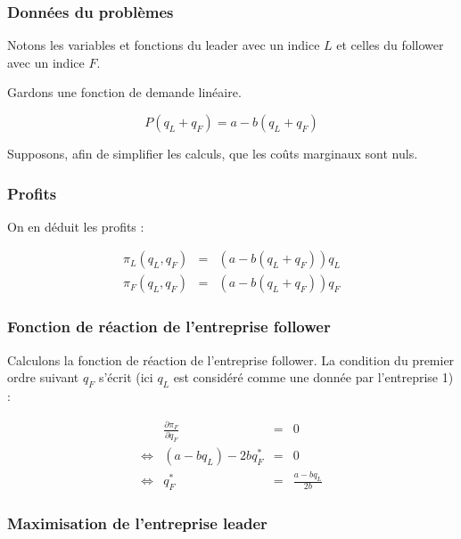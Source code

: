 \documentclass[
]{book}
\theoremstyle{definition}
\theoremstyle{definition}
\theoremstyle{definition}
\theoremstyle{definition}
\theoremstyle{remark}
\begin{document}
\hypertarget{donnuxe9es-du-probluxe8mes}{%
\subsubsection{Données du problèmes}\label{donnuxe9es-du-probluxe8mes}}

Notons les variables et fonctions du leader avec un indice \(L\) et celles du follower avec un indice \(F\).

Gardons une fonction de demande linéaire.

\[
P(q_L+q_F) = a - b(q_L+q_F)
\]

Supposons, afin de simplifier les calculs, que les coûts marginaux sont nuls.

\hypertarget{profits-1}{%
\subsubsection{Profits}\label{profits-1}}

On en déduit les profits :

\[
\begin{array}{rcl}
\pi_L(q_L, q_F) &=& \left(a-b(q_L+q_F)\right)q_L\\
\pi_F(q_L, q_F) &=& \left(a-b(q_L+q_F)\right)q_F
\end{array}
\]

\hypertarget{fonction-de-ruxe9action-de-lentreprise-follower}{%
\subsubsection{Fonction de réaction de l'entreprise follower}\label{fonction-de-ruxe9action-de-lentreprise-follower}}

Calculons la fonction de réaction de l'entreprise follower.
La condition du premier ordre suivant \(q_F\) s'écrit (ici \(q_L\) est considéré comme une donnée par l'entreprise 1) :

\[
\begin{array}{crcl}
&\frac{\partial \pi_F}{\partial q_F}&=&0\\
\Leftrightarrow & (a-bq_L)-2bq_F^* &=& 0\\
\Leftrightarrow & q_F^* &=& \frac{a-bq_L}{2b}
\label{eq:FRFollower}
\end{array}
\]

\hypertarget{maximisation-de-lentreprise-leader}{%
\subsubsection{Maximisation de l'entreprise leader}\label{maximisation-de-lentreprise-leader}}
\end{document}
